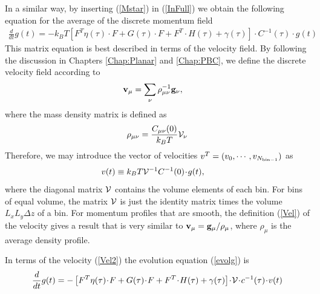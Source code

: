 \documentclass[b5paper,openright,10pt]{book}
\newcommand{\esc}{\!\cdot\!}
\begin{document}
In  a similar  way, by  inserting (\ref{Mstar})  in (\ref{InFull})  we
obtain the following equation for the average of the discrete momentum
field
\begin{align}
   \frac{d}{dt}g(t)= -k_BT \left[{F}^T{\eta}(\tau)\esc{F}
+{G}(\tau)\esc{F}
+F^T\esc{H}(\tau)+{\gamma}(\tau)\right]
\esc C^{-1}(\tau)\esc  g(t) 
\label{evolg}
\end{align}
This matrix equation is best described in terms of the velocity field.
By following  the discussion  in Chapters \ref{Chap:Planar} and \ref{Chap:PBC}, we  define the  discrete
velocity field according to
\begin{align}
  {\bf v}_\mu&=\sum_{\nu}\rho_{\mu\nu}^{-1}{\bf g}_\nu,
\label{Vel}
\end{align}
where the mass density  matrix is defined as
\begin{align}
\rho_{\mu\nu}=\frac{C_{\mu\nu}(0)}{k_BT}  {\cal V}_\nu
\label{rhomunuAp}
\end{align}
Therefore,  we  may  introduce  the  vector  of  velocities
$v^T=(v_0,\cdots,v_{N_{\rm bin -1}})$ as
\begin{align}
v(t)&\equiv  k_BT{\cal V}^{-1}C^{-1}(0) \esc g(t) ,
\label{Vel2}
\end{align}
where the diagonal  matrix ${\cal V}$ contains the  volume elements of
each bin.  For bins of equal volume, the matrix ${\cal V}$ is just the
identity  matrix times  the volume  $L_xL_y\Delta  z$ of  a bin.   For
momentum profiles that  are smooth, the definition  (\ref{Vel}) of the
velocity  gives a  result that  is very  similar to  ${\bf v}_\mu={\bf
  g}_\mu/\rho_\mu$, where $\rho_\mu$ is the average density profile.


In terms of the velocity (\ref{Vel2}) the evolution equation (\ref{evolg}) is
\begin{align}
   \frac{d}{dt}g(t)= -\left[{F}^T{\eta}(\tau)\esc{F}
+{G}(\tau)\esc{F}
+F^T\esc{H}(\tau)+{\gamma}(\tau)\right]
\esc {\cal V} \esc c^{-1}(\tau)\esc v(t)
\label{evolg2}
\end{align}
\end{document}
